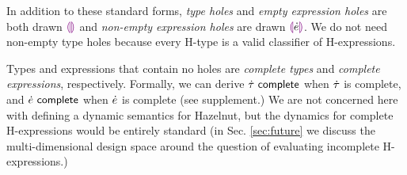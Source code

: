 In addition to these standard forms, \emph{type holes} and \emph{empty expression holes} are both drawn $\textcolor{violet}{\llparenthesis}\textcolor{violet}{\rrparenthesis}$ and \emph{non-empty expression holes} are drawn $\textcolor{violet}{\llparenthesis}\dot{e}\textcolor{violet}{\rrparenthesis}$. We do not need non-empty type holes because every H-type is a valid classifier of H-expressions. 

Types and expressions that contain no holes are \emph{complete types} and \emph{complete expressions}, respectively. Formally, we can derive $\dot{\tau}~\mathsf{complete}$ when $\dot{\tau}$ is complete, and $\dot{e}~\mathsf{complete}$ when $\dot{e}$ is complete (see supplement.) We are not concerned here with defining a dynamic semantics for Hazelnut, but the dynamics for complete H-expressions would be entirely standard (in Sec. \ref{sec:future} we discuss the multi-dimensional design space around the question of evaluating incomplete H-expressions.)%

